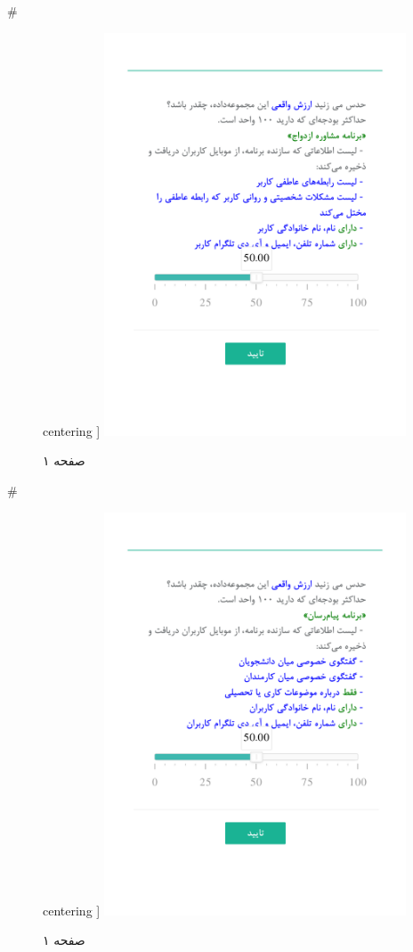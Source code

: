 { 
 # 
\begin{figure}[htpb]
centering ]
\includegraphics[width=0.8\textwidth]{./img/Task67.png/}
\caption{صفحه ۱}
\label{fig:Task1}
\end{figure}
 
 
 # 
\begin{figure}[htpb]
centering ]
\includegraphics[width=0.8\textwidth]{./img/Task68.png/}
\caption{صفحه ۱}
\label{fig:Task1}
\end{figure}
 
}
